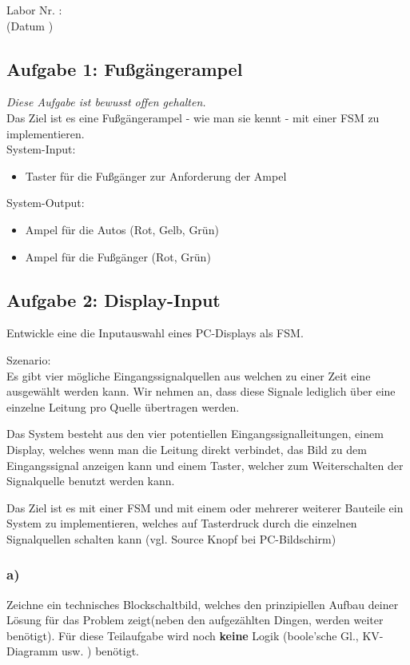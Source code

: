 \documentclass[a4paper]{scrartcl}
\def\header#1#2{
  \begin{center}
    {\Large Labor #1: \TOPIC}\\
    {(Datum #2)}
  \end{center}
}
\begin{document}
\header{Nr. \NUMBER}{\DATE}


\subsection*{Aufgabe 1: Fußgängerampel}
\textit{Diese Aufgabe ist bewusst offen gehalten.}\\
Das Ziel ist es eine Fußgängerampel - wie man sie kennt - mit einer FSM zu implementieren.\\
System-Input:
\begin{itemize}
  \item Taster für die Fußgänger zur Anforderung der Ampel
\end{itemize}

System-Output:
\begin{itemize}
  \item Ampel für die Autos (Rot, Gelb, Grün)
  \item Ampel für die Fußgänger (Rot, Grün)
\end{itemize}

\subsection*{Aufgabe 2: Display-Input}
Entwickle eine die Inputauswahl eines PC-Displays als FSM.

Szenario:\\
Es gibt vier mögliche Eingangssignalquellen
aus welchen zu einer Zeit 
eine ausgewählt werden kann. Wir nehmen an, dass diese Signale
lediglich über eine einzelne  Leitung pro Quelle 
übertragen werden.

Das System besteht aus den vier  potentiellen Eingangssignalleitungen, einem  Display, welches wenn man die
Leitung direkt 
verbindet, das Bild zu dem Eingangssignal anzeigen kann und einem Taster, welcher zum Weiterschalten der Signalquelle
benutzt werden kann.

Das Ziel ist es mit einer FSM und mit einem oder mehrerer weiterer Bauteile ein System zu implementieren, welches auf 
Tasterdruck durch die einzelnen Signalquellen schalten kann (vgl. Source Knopf bei PC-Bildschirm)


\subsubsection*{a)}
Zeichne ein technisches Blockschaltbild, welches den prinzipiellen Aufbau 
deiner Lösung für das Problem zeigt(neben den 
aufgezählten Dingen, werden weiter benötigt). Für diese Teilaufgabe wird
noch \textbf{keine} 
Logik (boole'sche Gl., KV-Diagramm usw.
) benötigt.
\end{document}
